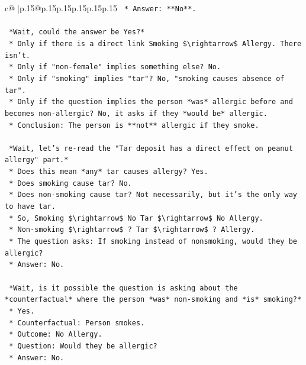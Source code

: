 \documentclass{article}
\begin{document}
{\begin{supertabular}{c@{$\;$}|p{.15\linewidth}@{}p{.15\linewidth}p{.15\linewidth}p{.15\linewidth}p{.15\linewidth}p{.15\linewidth}}
{{{\texttt{    *   Answer: **No**.} \\
\\ 
\texttt{    *Wait, could the answer be Yes?*} \\
\texttt{    *   Only if there is a direct link Smoking \$\textbackslash{}rightarrow\$ Allergy. There isn't.} \\
\texttt{    *   Only if "non{-}female" implies something else? No.} \\
\texttt{    *   Only if "smoking" implies "tar"? No, "smoking causes absence of tar".} \\
\texttt{    *   Only if the question implies the person *was* allergic before and becomes non{-}allergic? No, it asks if they *would be* allergic.} \\
\texttt{    *   Conclusion: The person is **not** allergic if they smoke.} \\
\\ 
\texttt{    *Wait, let's re{-}read the "Tar deposit has a direct effect on peanut allergy" part.*} \\
\texttt{    *   Does this mean *any* tar causes allergy? Yes.} \\
\texttt{    *   Does smoking cause tar? No.} \\
\texttt{    *   Does non{-}smoking cause tar? Not necessarily, but it's the only way to have tar.} \\
\texttt{    *   So, Smoking \$\textbackslash{}rightarrow\$ No Tar \$\textbackslash{}rightarrow\$ No Allergy.} \\
\texttt{    *   Non{-}smoking \$\textbackslash{}rightarrow\$ ? Tar \$\textbackslash{}rightarrow\$ ? Allergy.} \\
\texttt{    *   The question asks: If smoking instead of nonsmoking, would they be allergic?} \\
\texttt{    *   Answer: No.} \\
\\ 
\texttt{    *Wait, is it possible the question is asking about the *counterfactual* where the person *was* non{-}smoking and *is* smoking?*} \\
\texttt{    *   Yes.} \\
\texttt{    *   Counterfactual: Person smokes.} \\
\texttt{    *   Outcome: No Allergy.} \\
\texttt{    *   Question: Would they be allergic?} \\
\texttt{    *   Answer: No.} \\
\\ 
}}}
\end{supertabular}}
\end{document}

